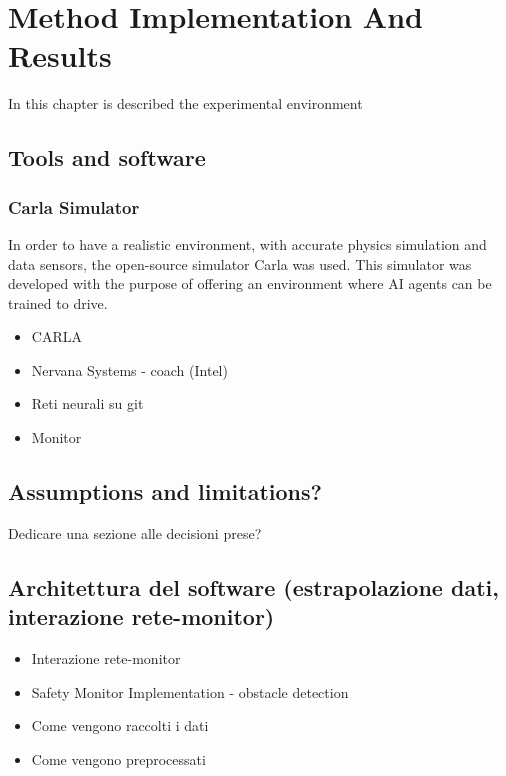 \chapter{Method Implementation And Results}

In this chapter is described the experimental environment

\section{Tools and software}

\subsection{Carla Simulator}

In order to have a realistic environment, with accurate physics simulation and data sensors, the open-source simulator Carla was used. This simulator was developed with the purpose of offering an environment where AI agents can be trained to drive.\newline

\begin{itemize}
	\item CARLA
	\item Nervana Systems - coach (Intel)
	\item Reti neurali su git
	\item Monitor
\end{itemize}


\section{Assumptions and limitations?}

Dedicare una sezione alle decisioni prese?

\section{Architettura del software (estrapolazione dati, interazione rete-monitor)}

\begin{itemize}
	
	\item Interazione rete-monitor
	\item Safety Monitor Implementation - obstacle detection
	\item Come vengono raccolti i dati
	\item Come vengono preprocessati
	
\end{itemize}

